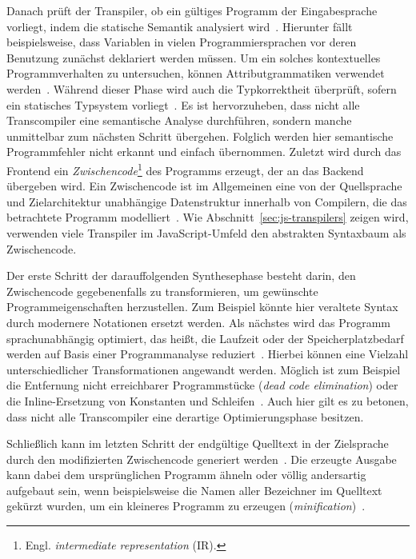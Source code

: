 Danach prüft der Transpiler, ob ein gültiges Programm der Eingabesprache vorliegt, indem die statische Semantik analysiert wird~\autocite[8]{AHO:COMPILERS}. Hierunter fällt beispielsweise, dass Variablen in vielen Programmiersprachen vor deren Benutzung zunächst deklariert werden müssen. Um ein solches kontextuelles Programmverhalten zu untersuchen, können Attributgrammatiken verwendet werden~\autocite[161]{TORCZON:2007}. Während dieser Phase wird auch die Typkorrektheit überprüft, sofern ein statisches Typsystem vorliegt~\autocite{SCHOEPP:COMPILER}. Es ist hervorzuheben, dass nicht alle Transcompiler eine semantische Analyse durchführen, sondern manche unmittelbar zum nächsten Schritt übergehen. Folglich werden hier semantische Programmfehler nicht erkannt und einfach übernommen.
Zuletzt wird durch das Frontend ein \emph{Zwischencode}\footnote{Engl. \textit{intermediate representation} (IR).} des Programms erzeugt, der an das Backend übergeben wird. Ein Zwischencode ist im Allgemeinen eine von der Quellsprache und Zielarchitektur unabhängige Datenstruktur innerhalb von Compilern, die das betrachtete Programm modelliert~\autocite[6]{TORCZON:2007}. Wie Abschnitt~\ref{sec:js-transpilers} zeigen wird, verwenden viele Transpiler im JavaScript-Umfeld den abstrakten Syntaxbaum als Zwischencode.

Der erste Schritt der darauffolgenden Synthesephase besteht darin, den Zwischencode gegebenenfalls zu transformieren, um gewünschte Programmeigenschaften herzustellen. Zum Beispiel könnte hier veraltete Syntax durch modernere Notationen ersetzt werden. Als nächstes wird das Programm sprachunabhängig optimiert, das heißt, die Laufzeit oder der Speicherplatzbedarf werden auf Basis einer Programmanalyse reduziert~\autocite[405]{TORCZON:2007}. Hierbei können eine Vielzahl unterschiedlicher Transformationen angewandt werden. Möglich ist zum Beispiel die Entfernung nicht erreichbarer Programmstücke (\textit{dead code elimination}) oder die Inline-Ersetzung von Konstanten und Schleifen~\autocites{TORCZON:2007}{SCHOEPP:COMPILER}. Auch hier gilt es zu betonen, dass nicht alle Transcompiler eine derartige Optimierungsphase besitzen.

Schließlich kann im letzten Schritt der endgültige Quelltext in der Zielsprache durch den modifizierten Zwischencode generiert werden~\autocite[505]{AHO:COMPILERS}. Die erzeugte Ausgabe kann dabei dem ursprünglichen Programm ähneln oder völlig andersartig aufgebaut sein, wenn beispielsweise die Namen aller Bezeichner im Quelltext gekürzt wurden, um ein kleineres Programm zu erzeugen (\textit{minification})~\autocite{FOWLER:TRANSPARENT}.

